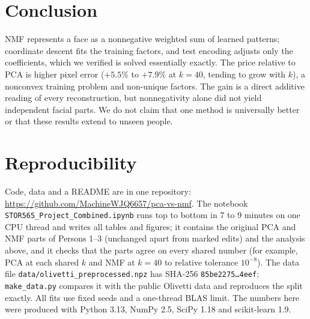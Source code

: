 \documentclass[10pt]{article}
\begin{document}
\section{Conclusion}
NMF represents a face as a nonnegative weighted sum of learned patterns; coordinate descent fits the training factors, and test encoding adjusts only the coefficients, which we verified is solved essentially exactly. The price relative to PCA is higher pixel error ($+5.5\%$ to $+7.9\%$ at $k=40$, tending to grow with $k$), a nonconvex training problem and non-unique factors. The gain is a direct additive reading of every reconstruction, but nonnegativity alone did not yield independent facial parts. We do not claim that one method is universally better or that these results extend to unseen people.

\section{Reproducibility}
Code, data and a README are in one repository: \url{https://github.com/MachineWJQ6657/pca-vs-nmf}. The notebook \texttt{STOR565\_Project\_Combined.ipynb} runs top to bottom in 7 to 9 minutes on one CPU thread and writes all tables and figures; it contains the original PCA and NMF parts of Persons 1--3 (unchanged apart from marked edits) and the analysis above, and it checks that the parts agree on every shared number (for example, PCA at each shared $k$ and NMF at $k=40$ to relative tolerance $10^{-8}$). The data file \texttt{data/olivetti\_preprocessed.npz} has SHA-256 \texttt{85be2275\ldots4eef}; \texttt{make\_data.py} compares it with the public Olivetti data and reproduces the split exactly. All fits use fixed seeds and a one-thread BLAS limit. The numbers here were produced with Python 3.13, NumPy 2.5, SciPy 1.18 and scikit-learn 1.9.
\end{document}
